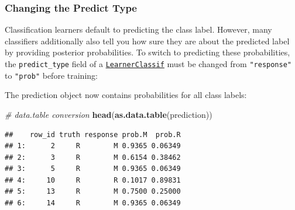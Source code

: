 \documentclass[]{article}
\newenvironment{Shaded}{\begin{snugshade}}{\end{snugshade}}
\newcommand{\CommentTok}[1]{\textcolor[rgb]{0.56,0.35,0.01}{\textit{#1}}}
\newcommand{\DataTypeTok}[1]{\textcolor[rgb]{0.13,0.29,0.53}{#1}}
\newcommand{\KeywordTok}[1]{\textcolor[rgb]{0.13,0.29,0.53}{\textbf{#1}}}
\newcommand{\NormalTok}[1]{#1}
\newcommand{\OperatorTok}[1]{\textcolor[rgb]{0.81,0.36,0.00}{\textbf{#1}}}
\newcommand{\StringTok}[1]{\textcolor[rgb]{0.31,0.60,0.02}{#1}}
\renewenvironment{Shaded} {\begin{snugshade}\small} {\end{snugshade}}
\begin{document}
\hypertarget{predict-type}{%
\subsubsection{Changing the Predict Type}\label{predict-type}}

Classification learners default to predicting the class label.
However, many classifiers additionally also tell you how sure they are about the predicted label by providing posterior probabilities.
To switch to predicting these probabilities, the \texttt{predict\_type} field of a \href{https://mlr3.mlr-org.com/reference/LearnerClassif.html}{\texttt{LearnerClassif}} must be changed from \texttt{"response"} to \texttt{"prob"} before training:

\begin{Shaded}
\end{Shaded}

The prediction object now contains probabilities for all class labels:

\begin{Shaded}
\begin{Highlighting}[]
\CommentTok{# data.table conversion}
\KeywordTok{head}\NormalTok{(}\KeywordTok{as.data.table}\NormalTok{(prediction))}
\end{Highlighting}
\end{Shaded}

\begin{verbatim}
##    row_id truth response prob.M  prob.R
## 1:      2     R        M 0.9365 0.06349
## 2:      3     R        M 0.6154 0.38462
## 3:      5     R        M 0.9365 0.06349
## 4:     10     R        R 0.1017 0.89831
## 5:     13     R        M 0.7500 0.25000
## 6:     14     R        M 0.9365 0.06349
\end{verbatim}

\begin{Shaded}
\end{Shaded}
\end{document}
